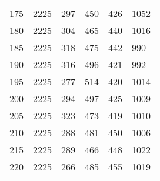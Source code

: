 \begin{longtable}{|l|l|l|l|l|l|}
175 & 2225 & 297 & 450 & 426 & 1052 \\
180 & 2225 & 304 & 465 & 440 & 1016 \\
185 & 2225 & 318 & 475 & 442 & 990 \\
190 & 2225 & 316 & 496 & 421 & 992 \\
195 & 2225 & 277 & 514 & 420 & 1014 \\
200 & 2225 & 294 & 497 & 425 & 1009 \\
205 & 2225 & 323 & 473 & 419 & 1010 \\
210 & 2225 & 288 & 481 & 450 & 1006 \\
215 & 2225 & 289 & 466 & 448 & 1022 \\
220 & 2225 & 266 & 485 & 455 & 1019 \\


	
	
	\bottomrule
\end{longtable}




